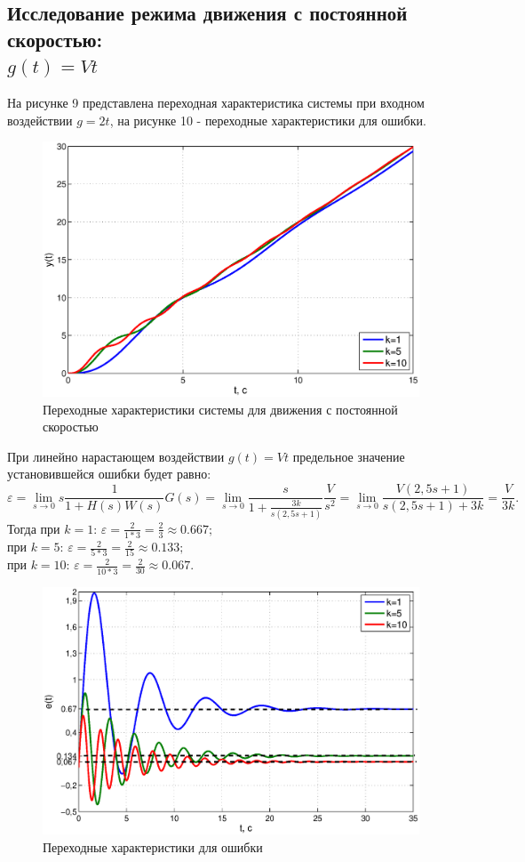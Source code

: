 \documentclass[12pt,a4paper]{article}
\begin{document}
\subsection{Исследование режима движения с постоянной скоростью: \\$g(t)=Vt$} 
На рисунке 9 представлена переходная характеристика системы при входном воздействии $g=2t$, на рисунке 10  - переходные характеристики для ошибки.
\begin{figure}[H]
	\centering
	\includegraphics[width=1\linewidth]{2.2.1.eps}
	\caption{Переходные характеристики системы для движения с постоянной скоростью}
\end{figure}
При линейно нарастающем воздействии $g(t)=Vt$ предельное значение установившейся ошибки будет равно:
\begin{equation}
    \varepsilon = \lim_{s\to 0}s\frac{1}{1+H(s)W(s)}G(s) = \lim_{s\to 0}\frac{s}{1 + \displaystyle{\frac{3k}{s(2,5s+1)}}}\frac{V}{s^2} = \lim_{s\to0} \frac{V(2,5s+1)}{s(2,5s+1)+3k}= \frac{V}{3k}.
\end{equation}
Тогда при $k=1$: $\varepsilon = \displaystyle{\frac{2}{1*3} = \frac{2}{3} \approx  0.667;}$\\
при $k=5$: $\varepsilon = \displaystyle{\frac{2}{5*3} = \frac{2}{15} \approx  0.133;}$\\
при $k=10$: $\varepsilon = \displaystyle{\frac{2}{10*3} = \frac{2}{30} \approx  0.067.}$
\begin{figure}[H]
	\centering
	\includegraphics[width=0.95\linewidth]{2.2.2.eps}
	\caption{Переходные характеристики для ошибки}
\end{figure}
\end{document}
